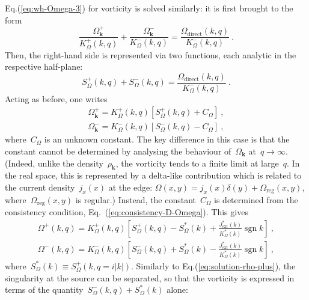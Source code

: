 \documentclass[preprint,aps,eqsecnum]{revtex4-1}
\newcommand{\fplus}[1]{{#1}^{+}}
\newcommand{\fminus}[1]{{#1}^{-}}
\newcommand{\sgn}{\mathop{\mathrm{sgn}}\nolimits}
\newcommand{\dct}[1]{{#1}_\mathrm{direct}}
\begin{document}
Eq.(\ref{eq:wh-Omega-3}) for vorticity is solved similarly: it is first
brought to the form
\begin{equation}
  \frac{\fplus{\Omega}_{\bm k}}{\fplus{K}_\Omega(k, q)}
+ \frac{\fminus{\Omega}_{\bm k}}{\fminus{K}_\Omega(k, q)} =
\frac{\dct{\Omega}(k, q)}{\fminus{K}_\Omega(k, q)}
\ .
\end{equation}
Then, the right-hand side is represented via two functions,
each analytic in the respective half-plane:
\begin{equation}
  \label{eq:psi-def}
  \fplus{S}_\Omega(k, q) + \fminus{S}_\Omega(k, q)
  = \frac{\dct{\Omega}(k, q)}{\fminus{K}_\Omega(k, q)}
  \ .
\end{equation}
Acting as before, one writes
\begin{align}
  \fplus{\Omega}_{\bm k} = \fplus{K}_\Omega(k, q) \left[\fplus{S}_\Omega(k, q)
  + C_\Omega\right]
  \ ,
  \\
  \fminus{\Omega}_{\bm k} = \fminus{K}_\Omega(k, q) \left[
  \fminus{S}_\Omega(k, q)
  - C_\Omega\right]
  \ ,
\end{align}
where~$C_\Omega$ is an unknown constant. The key difference in this case
is that the constant cannot be determined by analysing  the behaviour
of~$\Omega_{\bm k}$ at~$q \to \infty$.
(Indeed, unlike the density~$\rho_{\bm k}$,
the vorticity tends to a finite limit at large~$q$. In  the real space,
this is represented by a delta-like contribution which is related to the
current density~$j_x(x)$ at the edge:
$\Omega(x, y) = j_x(x) \delta(y) + \Omega_\mathrm{reg}(x, y)$,
where~$\Omega_\mathrm{reg}(x, y)$ is regular.)
Instead, the constant~$C_\Omega$ is determined from the consistency condition,
Eq.~(\ref{eq:consistency-D-Omega}). This gives
\begin{align}
  \label{eq:solution-omega-plus-0}
  \fplus{\Omega}(k, q)
  = \fplus{K}_\Omega(k, q)  \left[\fplus{S}_\Omega(k, q) - S_\Omega^\ast(k) +
  \frac{J_\mathrm{ext}^\ast(k)}{K_\Omega^\ast(k)}\sgn{k} \right]
  \ ,
  \\
  \label{eq:solution-omega-minus}
  \fminus{\Omega}(k, q) = \fminus{K}_\Omega(k, q)
  \left[\fminus{S}_\Omega(k, q) + S_\Omega^\ast(k)
  - \frac{J_\mathrm{ext}^\ast(k)}{K_\Omega^\ast(k)} \sgn{k}\right]
  \ ,
\end{align}
where~$S_\Omega^\ast(k) \equiv \fplus{S}_\Omega(k, q = i |k|)$. Similarly to Eq.(\ref{eq:solution-rho-plus}), the singularity at the source can
be separated, so that the vorticity is
expressed in terms of the quantity~$\fminus{S}_\Omega(k, q)
+ S_\Omega^\ast(k)$ alone:
\end{document}
